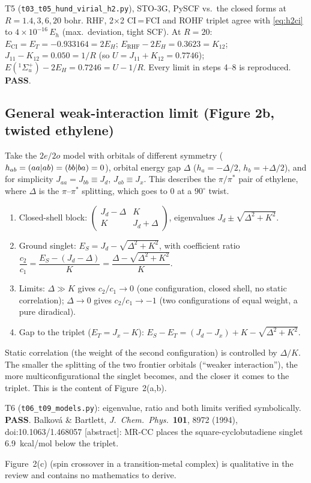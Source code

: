 \begin{verifybox}
T5 (\texttt{t03\_t05\_hund\_virial\_h2.py}), STO-3G, PySCF vs.\ the closed forms at $R=1.4,3,6,20$ bohr.
RHF, 2$\times$2 CI\,=\,FCI and ROHF triplet agree with \cref{eq:h2ci} to $4\times10^{-16}\,E_h$ (max.\ deviation, tight SCF). At $R=20$:
$E_{\text{CI}}=E_T=-0.933164=2E_H$; $E_{\text{RHF}}-2E_H=0.3623=K_{12}$; $J_{11}-K_{12}=0.050=1/R$ (so $U=J_{11}+K_{12}=0.7746$);
$E(^1\Sigma_u^+)-2E_H=0.7246=U-1/R$. Every limit in steps 4--8 is reproduced. \textbf{PASS}.
\end{verifybox}

\subsection{General weak-interaction limit (Figure 2b, twisted ethylene)}
Take the $2e/2o$ model with orbitals of different symmetry ($h_{ab}=(aa\vert ab)=(bb\vert ba)=0$), orbital
energy gap $\Delta$ ($h_a=-\Delta/2$, $h_b=+\Delta/2$), and for simplicity $J_{aa}=J_{bb}\equiv J_d$,
$J_{ab}\equiv J_x$. This describes the $\pi/\pi^*$ pair of ethylene, where $\Delta$ is the $\pi$--$\pi^*$
splitting, which goes to $0$ at a $90^\circ$ twist.
\begin{enumerate}
  \item Closed-shell block: $\begin{pmatrix}J_d-\Delta&K\\K&J_d+\Delta\end{pmatrix}$, eigenvalues $J_d\pm\sqrt{\Delta^2+K^2}$.
  \item Ground singlet: $E_S=J_d-\sqrt{\Delta^2+K^2}$, with coefficient ratio
        $\dfrac{c_2}{c_1}=\dfrac{E_S-(J_d-\Delta)}{K}=\dfrac{\Delta-\sqrt{\Delta^2+K^2}}{K}$.
  \item Limits: $\Delta\gg K$ gives $c_2/c_1\to0$ (one configuration, closed shell, no static correlation);
        $\Delta\to0$ gives $c_2/c_1\to-1$ (two configurations of equal weight, a pure diradical).
  \item Gap to the triplet ($E_T=J_x-K$): $E_S-E_T=(J_d-J_x)+K-\sqrt{\Delta^2+K^2}$.
\end{enumerate}
\begin{resultbox}
Static correlation (the weight of the second configuration) is controlled by $\Delta/K$. The smaller
the splitting of the two frontier orbitals (``weaker interaction''), the more multiconfigurational the
singlet becomes, and the closer it comes to the triplet. This is the content of Figure~2(a,b).
\end{resultbox}
\begin{verifybox}
T6 (\texttt{t06\_t09\_models.py}): eigenvalue, ratio and both limits verified symbolically. \textbf{PASS}.
Balkov\'a \& Bartlett, \emph{J.\ Chem.\ Phys.}\ \textbf{101}, 8972 (1994), doi:10.1063/1.468057
[abstract]: MR-CC places the square-cyclobutadiene singlet 6.9~kcal/mol below the triplet.
\end{verifybox}
Figure~2(c) (spin crossover in a transition-metal complex) is qualitative in the review and contains no
mathematics to derive.
